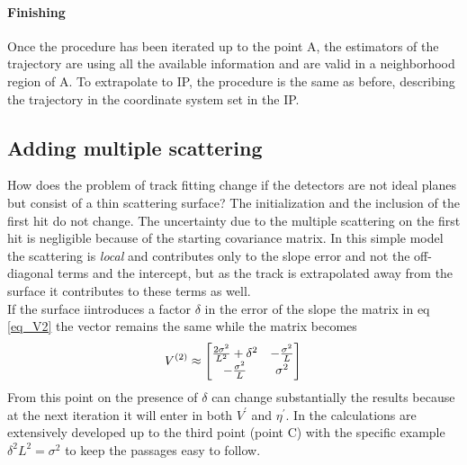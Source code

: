 \documentclass[12pt,a4paper,openright, oneside, titlepage]{book} %
\begin{document}
\paragraph{Finishing} Once the procedure has been iterated up to the point A, the estimators of the trajectory are using all the available information and are valid in a neighborhood region of A. 
To extrapolate to IP, the procedure is the same as before, describing the trajectory in the coordinate system set in the IP. 

\subsection*{Adding multiple scattering}
How does the problem of track fitting change if the detectors are not ideal planes but consist of a thin scattering surface? 
The initialization and the inclusion of the first hit do not change. 
The uncertainty due to the multiple scattering on the first hit is negligible because of the starting covariance matrix. 
In this simple model the scattering is \textit{local} and contributes only to the slope error and not the off-diagonal terms 
and the intercept, but as the track is extrapolated away from the surface it contributes to these terms as well.\\
If the surface iintroduces a factor $\delta$ in the error of the slope 
the matrix in eq \ref{eq_V2} the vector remains the same while the matrix becomes
$$
V^{(2)}\approx
\begin{bmatrix}
\frac{2\sigma^2}{L^2}+\delta^2 & -\frac{\sigma^2}{L} \\
-\frac{\sigma^2}{L} & \sigma^2
\end{bmatrix}\\
$$
From this point on the presence of $\delta$ can change substantially the results because at the next iteration it will enter in both $V^\prime$ and $\eta^\prime$.
 In \cite{KutschkePaper} the calculations are extensively developed up to the third point (point C) with the specific example $\delta^2L^2=\sigma^2$ to keep the passages easy to follow.

\end{document}
